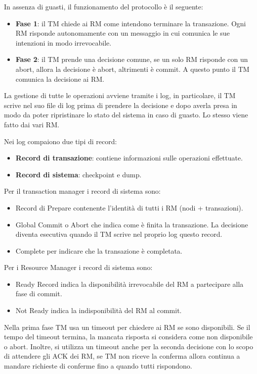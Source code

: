 In assenza di guasti, il funzionamento del protocollo è il seguente:
\begin{itemize}
    \item \textbf{Fase 1}: il TM chiede ai RM come intendono terminare la
          transazione. Ogni RM risponde autonomamente con un messaggio in cui
          comunica le sue intenzioni in modo irrevocabile.
    \item \textbf{Fase 2}: il TM prende una decisione comune, se un solo RM
          risponde con un abort, allora la decisione è abort, altrimenti è
          commit. A questo punto il TM comunica la decisione ai RM.
\end{itemize}
La gestione di tutte le operazioni avviene tramite i log, in particolare, il TM
scrive nel suo file di log prima di prendere la decisione e dopo averla presa
in modo da poter ripristinare lo stato del sistema in caso di guasto. Lo stesso
viene fatto dai vari RM.

Nei log compaiono due tipi di record:
\begin{itemize}
    \item \textbf{Record di transazione}: contiene informazioni sulle operazioni
          effettuate.
    \item \textbf{Record di sistema}: checkpoint e dump.
\end{itemize}

Per il transaction manager i record di sistema sono:
\begin{itemize}
    \item Record di Prepare contenente l'identità di tutti i RM (nodi + transazioni).
    \item Global Commit o Abort che indica come è finita la transazione. La
          decisione diventa esecutiva quando il TM scrive nel proprio log
          questo record.
    \item Complete per indicare che la transazione è completata.
\end{itemize}
Per i Resource Manager i record di sistema sono:
\begin{itemize}
    \item Ready Record indica la disponibilità irrevocabile del RM a partecipare
          alla fase di commit.
    \item Not Ready indica la indisponibilità del RM al commit.
\end{itemize}

Nella prima fase TM usa un timeout per chiedere ai RM se sono disponibili. Se il
tempo del timeout termina, la mancata risposta si considera come non disponibile
o abort. Inoltre, si utilizza un timeout anche per la seconda decisione con lo
scopo di attendere gli ACK dei RM, se TM non riceve la conferma allora continua
a mandare richieste di conferme fino a quando tutti rispondono.

